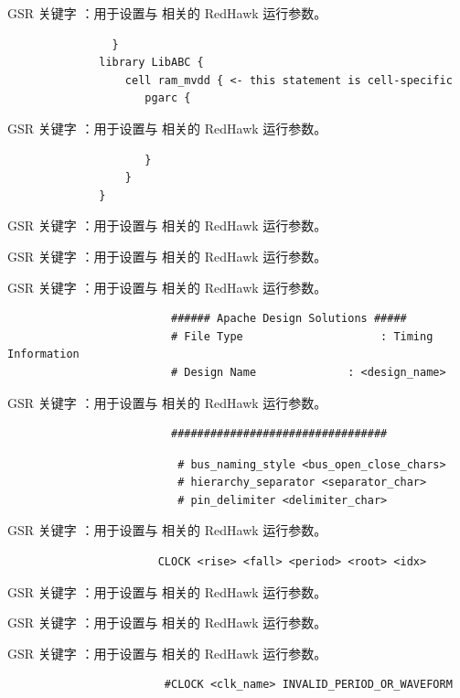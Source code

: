 GSR 关键字 ：用于设置与  相关的 RedHawk 运行参数。

\begin{lstlisting}
                }
              library LibABC {
                  cell ram_mvdd { <- this statement is cell-specific
                     pgarc {
\end{lstlisting}

GSR 关键字 ：用于设置与  相关的 RedHawk 运行参数。

\begin{lstlisting}
                     }
                  }
              }
\end{lstlisting}

GSR 关键字 ：用于设置与  相关的 RedHawk 运行参数。

GSR 关键字 ：用于设置与  相关的 RedHawk 运行参数。

GSR 关键字 ：用于设置与  相关的 RedHawk 运行参数。

\begin{lstlisting}
                         ###### Apache Design Solutions #####
                         # File Type                     : Timing Information
                         # Design Name              : <design_name>
\end{lstlisting}

GSR 关键字 ：用于设置与  相关的 RedHawk 运行参数。

\begin{lstlisting}
                         #################################
\end{lstlisting}

\begin{lstlisting}
                          # bus_naming_style <bus_open_close_chars>
                          # hierarchy_separator <separator_char>
                          # pin_delimiter <delimiter_char>
\end{lstlisting}

GSR 关键字 ：用于设置与  相关的 RedHawk 运行参数。

\begin{lstlisting}
                       CLOCK <rise> <fall> <period> <root> <idx>
\end{lstlisting}

GSR 关键字 ：用于设置与  相关的 RedHawk 运行参数。

GSR 关键字 ：用于设置与  相关的 RedHawk 运行参数。

GSR 关键字 ：用于设置与  相关的 RedHawk 运行参数。

\begin{lstlisting}
                        #CLOCK <clk_name> INVALID_PERIOD_OR_WAVEFORM
\end{lstlisting}


